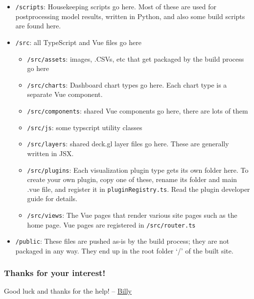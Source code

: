 \begin{itemize}
\tightlist
\item
  \texttt{/scripts}: Housekeeping scripts go here. Most of these are
  used for postprocessing model results, written in Python, and also
  some build scripts are found here.
\item
  \texttt{/src}: all TypeScript and Vue files go here

  \begin{itemize}
  \tightlist
  \item
    \texttt{/src/assets}: images, .CSVs, etc that get packaged by the
    build process go here
  \item
    \texttt{/src/charts}: Dashboard chart types go here. Each chart type
    is a separate Vue component.
  \item
    \texttt{/src/components}: shared Vue components go here, there are
    lots of them
  \item
    \texttt{/src/js}: some typscript utility classes
  \item
    \texttt{/src/layers}: shared deck.gl layer files go here. These are
    generally written in JSX.
  \item
    \texttt{/src/plugins}: Each visualization plugin type gets its own
    folder here. To create your own plugin, copy one of these, rename
    its folder and main .vue file, and register it in
    \texttt{pluginRegistry.ts}. Read the plugin developer guide for
    details.
  \item
    \texttt{/src/views}: The Vue pages that render various site pages
    such as the home page. Vue pages are registered in
    \texttt{/src/router.ts}
  \end{itemize}
\item
  \texttt{/public}: These files are pushed as-is by the build process;
  they are not packaged in any way. They end up in the root folder `/'
  of the built site.
\end{itemize}

\hypertarget{thanks-for-your-interest}{%
\subsubsection{Thanks for your
interest!}\label{thanks-for-your-interest}}

Good luck and thanks for the help! --
\href{https://github.com/billyc}{Billy}
